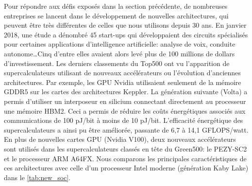         Pour répondre aux défis exposés dans la section précédente, de nombreuses entreprises se lancent dans le développement de nouvelles architectures, qui peuvent être très différentes de celles que nous utilisons depuis 30 ans. En janvier 2018, une étude \cite{Metz2018} a dénombré 45 start-ups qui développaient des circuits spécialisés pour certaines applications d’intelligence artificielle: analyse de voix, conduite autonome\ldots Cinq  d’entre elles avaient alors levé plus de 100 millions de dollars d’investissement. Les derniers classements du Top500 ont vu l'apparition de supercalculateurs utilisant de nouveaux accélérateurs ou l'évolution d'anciennes architectures. Par exemple, les GPU Nvidia utilisaient seulement de la mémoire GDDR5 sur les cartes des architectures Keppler. La génération suivante (Volta) a permis d'utiliser un interposeur en silicium connectant directement au processeur une mémoire HBM2. Ceci a permis de réduire les coûts énergétiques associés aux communications de 100 pJ/bit à moins de 10 pJ/bit. L'efficacité énergétique des supercalculateurs a ainsi pu être améliorée, passante de 6,7 à 14,1 GFLOPS/watt. En plus de nouvelles cartes GPU (Nvidia V100), deux nouveaux accélérateurs sont utilisés dans les supercalculateurs classés en tête du Green500: le PEZY-SC2 et le processeur ARM A64FX. Nous comparons les principales caractéristiques de ces architectures avec celle d'un processeur Intel moderne (génération Kaby Lake) dans le \autoref{tab:new_soc}.
        
                
        \begin{table}
        \centering
        \caption{Caractéristiques et performances d'architectures utilisées dans les supercalculateurs les plus efficaces du Top500.}
        \label{tab:new_soc}
        \end{table}
                
